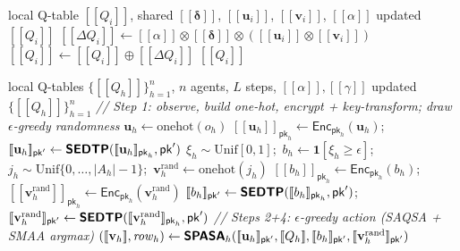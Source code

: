 \documentclass[letterpaper,10pt]{article}
\newcommand{\textbt}[1]{\textsf{\textbf{#1}}}
\theoremstyle{remark}
\newcommand{\En}[1]{[\![#1]\!]}
\newcommand{\deltav}{\boldsymbol{\delta}}
\begin{document}
\begin{algorithm}[t]
\caption{\textbt{SQUA}: Secure Q-Update}
\label{alg:squa}
\small
\begin{algorithmic}[1]
\Require local Q-table $\En{Q_i}$, shared $\En{\deltav}$, $\En{\mathbf{u}_i}$,
$\En{\mathbf{v}_i}$, $\En{\alpha}$
\Ensure updated $\En{Q_i}$
\State $\En{\Delta Q_i} \gets \En{\alpha} \otimes \En{\deltav}
  \otimes (\En{\mathbf{u}_i} \otimes \En{\mathbf{v}_i})$
\State $\En{Q_i} \gets \En{Q_i} \oplus \En{\Delta Q_i}$
\State \Return $\En{Q_i}$
\end{algorithmic}
\end{algorithm}

\begin{algorithm}[t]
\caption{\textbt{SMARLA}: Secure Multi-Agent RL Training}
\label{alg:smarla}
\small
\begin{algorithmic}[1]
\Require local Q-tables $\{\En{Q_h}\}_{h=1}^n$, $n$ agents, $L$ steps,
$\En{\alpha}, \En{\gamma}$
\Ensure updated $\{\En{Q_h}\}_{h=1}^n$
  \Statex \textit{// Step 1: observe, build one-hot, encrypt + key-transform;
    draw $\epsilon$-greedy randomness}
    \State $\mathbf{u}_h \gets \mathrm{onehot}(o_h)$
    \State $\En{\mathbf{u}_h}_{\mathsf{pk}_h} \gets
      \mathsf{Enc}_{\mathsf{pk}_h}(\mathbf{u}_h)$;\quad
      $\En{\mathbf{u}_h}_{\mathsf{pk}'} \gets
      \textbt{SEDTP}(\En{\mathbf{u}_h}_{\mathsf{pk}_h}, \mathsf{pk}')$
    \State $\xi_h \sim \mathrm{Unif}[0,1]$;\ $b_h \gets \mathbf{1}[\xi_h\ge\epsilon]$;\quad
      $j_h \sim \mathrm{Unif}\{0,\ldots,|A_h|-1\}$;\ $\mathbf{v}^{\mathrm{rand}}_h \gets \mathrm{onehot}(j_h)$
    \State $\En{b_h}_{\mathsf{pk}_h} \gets \mathsf{Enc}_{\mathsf{pk}_h}(b_h)$;\quad
      $\En{\mathbf{v}^{\mathrm{rand}}_h}_{\mathsf{pk}_h} \gets
      \mathsf{Enc}_{\mathsf{pk}_h}(\mathbf{v}^{\mathrm{rand}}_h)$
    \State $\En{b_h}_{\mathsf{pk}'} \gets
      \textbt{SEDTP}(\En{b_h}_{\mathsf{pk}_h}, \mathsf{pk}')$;\quad
      $\En{\mathbf{v}^{\mathrm{rand}}_h}_{\mathsf{pk}'} \gets
      \textbt{SEDTP}(\En{\mathbf{v}^{\mathrm{rand}}_h}_{\mathsf{pk}_h}, \mathsf{pk}')$
  \EndFor
  \Statex \textit{// Steps 2+4: $\epsilon$-greedy action (SAQSA + SMAA argmax)}
    \State $(\En{\mathbf{v}_h}, \mathit{row}_h) \gets
      \textbt{SPASA}_h(\En{\mathbf{u}_h}_{\mathsf{pk}'}, \En{Q_h},
      \En{b_h}_{\mathsf{pk}'}, \En{\mathbf{v}^{\mathrm{rand}}_h}_{\mathsf{pk}'})$

\end{algorithmic}
\end{algorithm}
\end{document}
